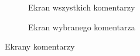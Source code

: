 \begin{figure}[ht]
\begin{subfigure}[t]{0.32\textwidth}
    \caption{Ekran wszystkich komentarzy}
  \end{subfigure}
  \begin{subfigure}[t]{0.32\textwidth}
    \centering
    \caption{Ekran wybranego komentarza}
  \end{subfigure}
  \caption{Ekrany komentarzy}
  \label{fig:ratings}
\end{figure}
